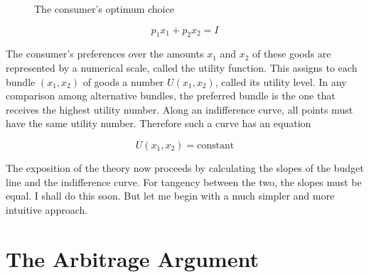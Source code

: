 \begin{figure}[!tb] %
\centering %
\caption{The consumer's optimum choice} %
\label{Fig1.1} %
\end{figure}


\begin{equation}\label{equa1.1}
p_1 x_1 + p_2 x_2 = I
\end{equation} 

The consumer's preferences over the amounts $x_1$ and $x_2$ of these goods are represented by a numerical scale, called the utility function. This assigns to each bundle $(x_1, x_2)$
of goods a number $U(x_1, x_2)$, called its utility level. In any comparison among alternative bundles, the preferred bundle is the one that receives the highest utility number. Along an indifference curve, all points must have the same utility number. Therefore such a curve has an equation

\begin{equation}\label{equa1.2}
U(x_1, x_2) = \mbox{constant}
\end{equation} 

The exposition of the theory now proceeds by calculating the slopes of the budget line and the indifference curve. For tangency between the two, the slopes must be equal. I shall do this soon. But let me begin with a much simpler and more intuitive approach.

\section*{The Arbitrage Argument}

